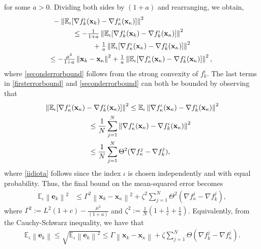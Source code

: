 \documentclass[draftcls,onecolumn,12pt]{IEEEtran}
\theoremstyle{plain}
\def\x{\mathbf{x}}
\def\e{\mathbf{e}}
\def\EE{\mathbb{E}}
\providecommand{\norm}[1]{\left\|#1\right\|}
\theoremstyle{plain}
\theoremstyle{remark}
\begin{document}
for some $a>0$. 
Dividing both sides by $(1+a)$ and rearranging, we obtain,
\begin{align}
&-\norm{\EE_{\iota}[\nabla f_k^{\iota}(\x_k)-\nabla f_{\kappa}^{\iota}(\x_{\kappa})]}^2 \nonumber\\
&\hspace{1cm} \leq  -\tfrac{1}{1+a}\norm{\EE_{\iota}[\nabla f_k^{\iota}(\x_k)-\nabla f_{k}^{\iota}(\x_{\kappa})]}^2 \nonumber \\  
&\hspace{2cm} + \tfrac{1}{a}\norm{\EE_{\iota}[\nabla f_{\kappa}^{\iota}(\x_{\kappa})-\nabla f_k^{\iota}(\x_{\kappa})]}^2 \nonumber \\
&\hspace{-2mm}\leq-\tfrac{\mu^2}{1+a}\norm{\x_k-\x_{\kappa}}^2  + \tfrac{1}{a}\norm{\EE_{\iota}[\nabla f_{\kappa}^{\iota}(\x_{\kappa})-\nabla f_k^{\iota}(\x_{\kappa})]}^2\label{seconderrorbound},
\end{align}
where \eqref{seconderrorbound} follows from the strong convexity of $f_k^\iota$. The last terms in \eqref{firsterrorbound} and \eqref{seconderrorbound} can both be bounded by observing that 
\begin{align}
\norm{\EE_{\iota}[\nabla f_{\kappa}^{\iota}(\x_{\kappa})-\nabla f_k^{\iota}(\x_{\kappa})]}^2 &\leq \EE_\iota\norm{\nabla f_{\kappa}^{\iota}(\x_{\kappa})-\nabla f_k^{\iota}(\x_{\kappa})}^2 \nonumber\\
&\hspace{-2cm}\leq \frac{1}{N}\sum_{j=1}^N \norm{\nabla f_{\kappa}^{\iota}(\x_{\kappa})-\nabla f_k^{\iota}(\x_{\kappa})}^2\label{iidiota}\\
&\hspace{-2cm}\leq \frac{1}{N}\sum_{j=1}^N\Theta^2(\nabla f_\kappa^j-\nabla f_k^j)\label{theta},
\end{align}
where \eqref{iidiota} follows since the index $\iota$ is chosen independently and with equal probability. Thus, the final bound on the mean-squared error becomes
\begin{align}
\EE_{\iota}\norm{\e_k}^2 &\leq  \Gamma^2\norm{\x_k-\x_{\kappa}}^2 + \zeta^2\sum_{j=1}^N\Theta^2(\nabla f_{\kappa}^j-\nabla f_k^j) \label{lipsaga},
\end{align}
where $\Gamma^2 :=  L^2(1+c)-\tfrac{\mu^2}{(1+a)}$ and $\zeta^2:=\frac{1}{N}(1+\tfrac{1}{c}+\tfrac{1}{a})$. 
Equivalently, from the Cauchy-Schwarz inequality, we have that  
\begin{align}
\EE_\iota\!\!\norm{\e_k} \!\!\leq\!\! \sqrt{\!\EE_{\iota}\!\norm{\e_k}^2}\!\!\leq\!\! \Gamma\!\norm{\x_k\!\!-\!\!\x_{\kappa}} \!\!+\!\!\zeta\sum_{j=1}^N\Theta(\nabla f_k^j - \nabla f_{\kappa}^j)\label{svrgbnd1}.
\end{align}
\end{document}

